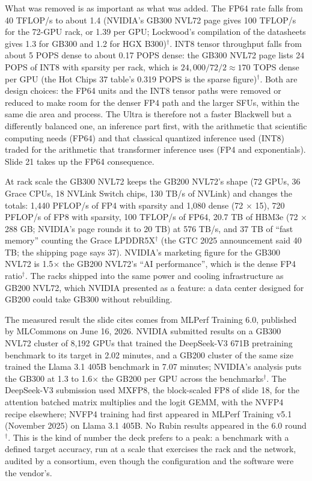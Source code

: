 \documentclass[11pt,letterpaper]{article}
\begin{document}
What was removed is as important as what was added. The FP64 rate falls from 40 TFLOP/s to about 1.4 (NVIDIA's GB300 NVL72 page gives 100 TFLOP/s for the 72-GPU rack, or 1.39 per GPU; Lockwood's compilation of the datasheets gives 1.3 for GB300 and 1.2 for HGX B300)$^\dagger$. INT8 tensor throughput falls from about 5 POPS dense to about 0.17 POPS dense: the GB300 NVL72 page lists 24 POPS of INT8 with sparsity per rack, which is $24{,}000 / 72 / 2 \approx 170$ TOPS dense per GPU (the Hot Chips 37 table's 0.319 POPS is the sparse figure)$^\dagger$. Both are design choices: the FP64 units and the INT8 tensor paths were removed or reduced to make room for the denser FP4 path and the larger SFUs, within the same die area and process. The Ultra is therefore not a faster Blackwell but a differently balanced one, an inference part first, with the arithmetic that scientific computing needs (FP64) and that classical quantized inference used (INT8) traded for the arithmetic that transformer inference uses (FP4 and exponentials). Slide 21 takes up the FP64 consequence.

At rack scale the GB300 NVL72 keeps the GB200 NVL72's shape (72 GPUs, 36 Grace CPUs, 18 NVLink Switch chips, 130 TB/s of NVLink) and changes the totals: 1{,}440 PFLOP/s of FP4 with sparsity and 1{,}080 dense (72 $\times$ 15), 720 PFLOP/s of FP8 with sparsity, 100 TFLOP/s of FP64, 20.7 TB of HBM3e (72 $\times$ 288 GB; NVIDIA's page rounds it to 20 TB) at 576 TB/s, and 37 TB of ``fast memory'' counting the Grace LPDDR5X$^\dagger$ (the GTC 2025 announcement said 40 TB; the shipping page says 37). NVIDIA's marketing figure for the GB300 NVL72 is 1.5$\times$ the GB200 NVL72's ``AI performance'', which is the dense FP4 ratio$^\dagger$. The racks shipped into the same power and cooling infrastructure as GB200 NVL72, which NVIDIA presented as a feature: a data center designed for GB200 could take GB300 without rebuilding.

The measured result the slide cites comes from MLPerf Training 6.0, published by MLCommons on June 16, 2026. NVIDIA submitted results on a GB300 NVL72 cluster of 8{,}192 GPUs that trained the DeepSeek-V3 671B pretraining benchmark to its target in 2.02 minutes, and a GB200 cluster of the same size trained the Llama 3.1 405B benchmark in 7.07 minutes; NVIDIA's analysis puts the GB300 at 1.3 to 1.6$\times$ the GB200 per GPU across the benchmarks$^\dagger$. The DeepSeek-V3 submission used MXFP8, the block-scaled FP8 of slide 18, for the attention batched matrix multiplies and the logit GEMM, with the NVFP4 recipe elsewhere; NVFP4 training had first appeared in MLPerf Training v5.1 (November 2025) on Llama 3.1 405B. No Rubin results appeared in the 6.0 round$^\dagger$. This is the kind of number the deck prefers to a peak: a benchmark with a defined target accuracy, run at a scale that exercises the rack and the network, audited by a consortium, even though the configuration and the software were the vendor's.
\end{document}
